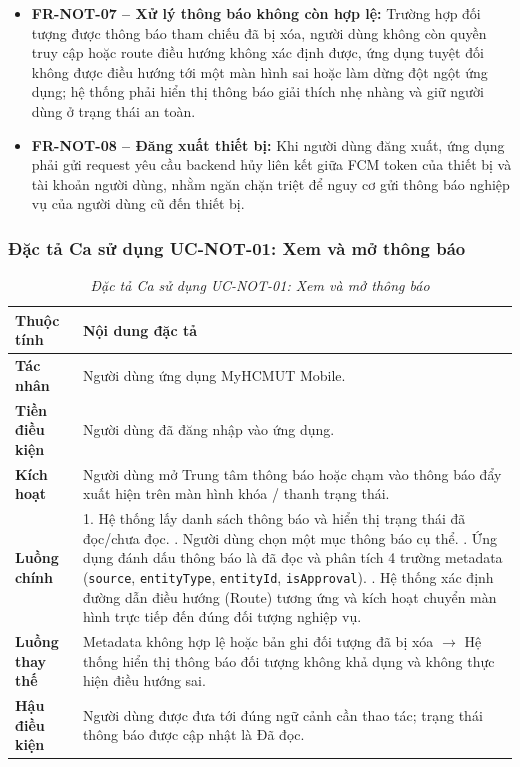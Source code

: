 \begin{itemize}[leftmargin=1.5cm]
    \item \textbf{FR-NOT-07 -- Xử lý thông báo không còn hợp lệ:} Trường hợp đối tượng được thông báo tham chiếu đã bị xóa, người dùng không còn quyền truy cập hoặc route điều hướng không xác định được, ứng dụng tuyệt đối không được điều hướng tới một màn hình sai hoặc làm dừng đột ngột ứng dụng; hệ thống phải hiển thị thông báo giải thích nhẹ nhàng và giữ người dùng ở trạng thái an toàn.
    
    \item \textbf{FR-NOT-08 -- Đăng xuất thiết bị:} Khi người dùng đăng xuất, ứng dụng phải gửi request yêu cầu backend hủy liên kết giữa FCM token của thiết bị và tài khoản người dùng, nhằm ngăn chặn triệt để nguy cơ gửi thông báo nghiệp vụ của người dùng cũ đến thiết bị.
\end{itemize}

\subsubsection{Đặc tả Ca sử dụng UC-NOT-01: Xem và mở thông báo}

\begin{table}[H]
\centering
\renewcommand{\arraystretch}{1.25}
\begin{tabularx}{\textwidth}{|p{3.2cm}|X|}
\hline
\textbf{Thuộc tính} & \textbf{Nội dung đặc tả} \\
\hline
\textbf{Tác nhân} & Người dùng ứng dụng MyHCMUT Mobile. \\
\hline
\textbf{Tiền điều kiện} & Người dùng đã đăng nhập vào ứng dụng. \\
\hline
\textbf{Kích hoạt} & Người dùng mở Trung tâm thông báo hoặc chạm vào thông báo đẩy xuất hiện trên màn hình khóa / thanh trạng thái. \\
\hline
\textbf{Luồng chính} & 
1. Hệ thống lấy danh sách thông báo và hiển thị trạng thái đã đọc/chưa đọc. \newline
2. Người dùng chọn một mục thông báo cụ thể. \newline
3. Ứng dụng đánh dấu thông báo là đã đọc và phân tích 4 trường metadata (\texttt{source}, \texttt{entityType}, \texttt{entityId}, \texttt{isApproval}). \newline
4. Hệ thống xác định đường dẫn điều hướng (Route) tương ứng và kích hoạt chuyển màn hình trực tiếp đến đúng đối tượng nghiệp vụ. \\
\hline
\textbf{Luồng thay thế} & Metadata không hợp lệ hoặc bản ghi đối tượng đã bị xóa $\rightarrow$ Hệ thống hiển thị thông báo đối tượng không khả dụng và không thực hiện điều hướng sai. \\
\hline
\textbf{Hậu điều kiện} & Người dùng được đưa tới đúng ngữ cảnh cần thao tác; trạng thái thông báo được cập nhật là Đã đọc. \\
\hline
\end{tabularx}
\caption{\textit{Đặc tả Ca sử dụng UC-NOT-01: Xem và mở thông báo}}
\label{tab:uc_not_01}
\end{table}

